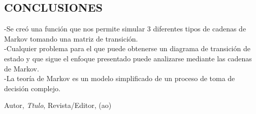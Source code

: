 \documentclass[10pt,a4paper]{article}
\theoremstyle{definition}
\theoremstyle{remark}
\begin{document}
\begin{multicols}{2}
\section{CONCLUSIONES}
\noindent -Se creó una función que nos permite simular 3 diferentes tipos de cadenas de Markov tomando una matriz de transición.\\
-Cualquier problema para el que puede obtenerse un diagrama de transición de estado y que sigue el enfoque presentado puede analizarse mediante las cadenas de Markov. \\
-La teoría de Markov es un modelo simplificado de un proceso de toma de decisión complejo.
  
\end{multicols}
\begin{thebibliography}{99}

 Autor, \emph{Ttulo}, Revista/Editor, (ao)

\end{thebibliography}
\end{document}
